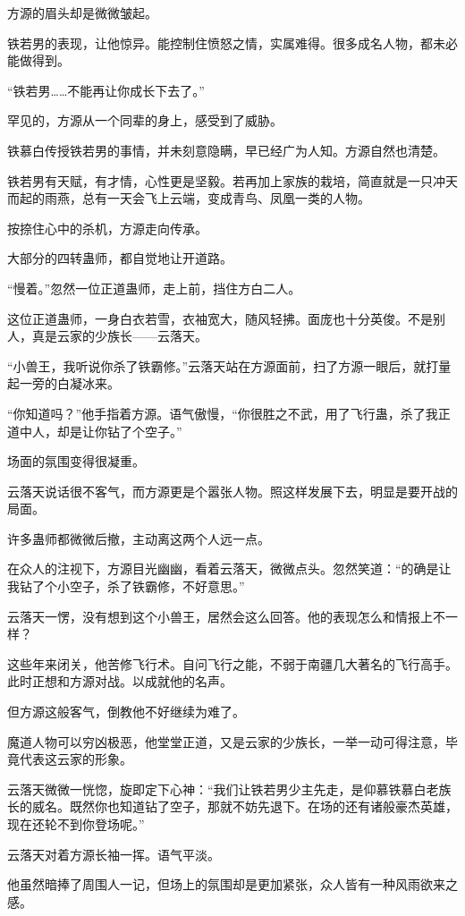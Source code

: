 \begin{this_body}
方源的眉头却是微微皱起。

铁若男的表现，让他惊异。能控制住愤怒之情，实属难得。很多成名人物，都未必能做得到。

“铁若男……不能再让你成长下去了。”

罕见的，方源从一个同辈的身上，感受到了威胁。

铁慕白传授铁若男的事情，并未刻意隐瞒，早已经广为人知。方源自然也清楚。

铁若男有天赋，有才情，心性更是坚毅。若再加上家族的栽培，简直就是一只冲天而起的雨燕，总有一天会飞上云端，变成青鸟、凤凰一类的人物。

按捺住心中的杀机，方源走向传承。

大部分的四转蛊师，都自觉地让开道路。

“慢着。”忽然一位正道蛊师，走上前，挡住方白二人。

这位正道蛊师，一身白衣若雪，衣袖宽大，随风轻拂。面庞也十分英俊。不是别人，真是云家的少族长——云落天。

“小兽王，我听说你杀了铁霸修。”云落天站在方源面前，扫了方源一眼后，就打量起一旁的白凝冰来。

“你知道吗？”他手指着方源。语气傲慢，“你很胜之不武，用了飞行蛊，杀了我正道中人，却是让你钻了个空子。”

场面的氛围变得很凝重。

云落天说话很不客气，而方源更是个嚣张人物。照这样发展下去，明显是要开战的局面。

许多蛊师都微微后撤，主动离这两个人远一点。

在众人的注视下，方源目光幽幽，看着云落天，微微点头。忽然笑道：“的确是让我钻了个小空子，杀了铁霸修，不好意思。”

云落天一愣，没有想到这个小兽王，居然会这么回答。他的表现怎么和情报上不一样？

这些年来闭关，他苦修飞行术。自问飞行之能，不弱于南疆几大著名的飞行高手。此时正想和方源对战。以成就他的名声。

但方源这般客气，倒教他不好继续为难了。

魔道人物可以穷凶极恶，他堂堂正道，又是云家的少族长，一举一动可得注意，毕竟代表这云家的形象。

云落天微微一恍惚，旋即定下心神：“我们让铁若男少主先走，是仰慕铁慕白老族长的威名。既然你也知道钻了空子，那就不妨先退下。在场的还有诸般豪杰英雄，现在还轮不到你登场呢。”

云落天对着方源长袖一挥。语气平淡。

他虽然暗捧了周围人一记，但场上的氛围却是更加紧张，众人皆有一种风雨欲来之感。


\end{this_body}
